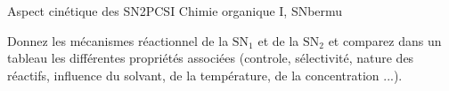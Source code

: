 
\begin{exercise}{Aspect cinétique des SN}{2}{PCSI}
{Chimie organique I, SN}{bermu}

\begin{questions}
\questioncours Donnez les mécanismes réactionnel de la $\mathrm{SN_1}$ et de la $\mathrm{SN_2}$ et comparez dans un tableau les différentes propriétés associées (controle, sélectivité, nature des réactifs, influence du solvant, de la température, de la concentration ...).


\end{questions}
\end{exercise}